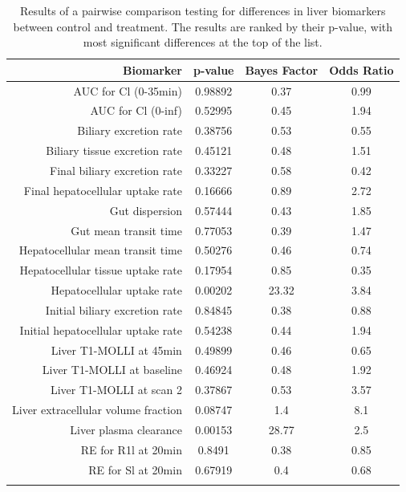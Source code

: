 \documentclass{epflreport}%
\begin{document}
%
\begin{longtable}{rccc}%
\hline%
Biomarker&p{-}value&Bayes Factor&Odds Ratio\\%
\hline%
AUC for Cl (0{-}35min)&0.98892&0.37&0.99\\%
AUC for Cl (0{-}inf)&0.52995&0.45&1.94\\%
Biliary excretion rate&0.38756&0.53&0.55\\%
Biliary tissue excretion rate&0.45121&0.48&1.51\\%
Final biliary excretion rate&0.33227&0.58&0.42\\%
Final hepatocellular uptake rate&0.16666&0.89&2.72\\%
Gut dispersion&0.57444&0.43&1.85\\%
Gut mean transit time&0.77053&0.39&1.47\\%
Hepatocellular mean transit time&0.50276&0.46&0.74\\%
Hepatocellular tissue uptake rate&0.17954&0.85&0.35\\%
Hepatocellular uptake rate&0.00202&23.32&3.84\\%
Initial biliary excretion rate&0.84845&0.38&0.88\\%
Initial hepatocellular uptake rate&0.54238&0.44&1.94\\%
Liver T1{-}MOLLI at 45min&0.49899&0.46&0.65\\%
Liver T1{-}MOLLI at baseline&0.46924&0.48&1.92\\%
Liver T1{-}MOLLI at scan 2&0.37867&0.53&3.57\\%
Liver extracellular volume fraction&0.08747&1.4&8.1\\%
Liver plasma clearance&0.00153&28.77&2.5\\%
RE for R1l at 20min&0.8491&0.38&0.85\\%
RE for Sl at 20min&0.67919&0.4&0.68\\%
\hline%
\caption{Results of a pairwise comparison testing for differences in liver biomarkers between control and treatment. The results are ranked by their p-value, with most significant differences at the top of the list.} \\%
\end{longtable}%
\end{document}
